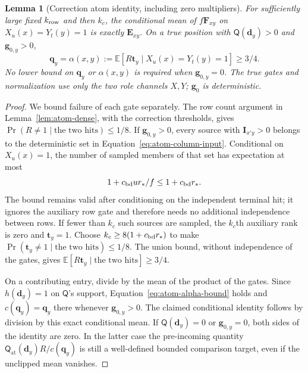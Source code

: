 \documentclass[11pt]{article}
\numberwithin{equation}{section}
\newtheorem{lemma}[theorem]{Lemma}
\theoremstyle{definition}
\theoremstyle{remark}
\begin{document}
\begin{lemma}[Correction atom identity, including zero multipliers]
\label{lem:atom-correction}
For sufficiently large fixed ${k_{\rm row}}$ and then ${k}_c$, the conditional mean of
$f{\mathbf{F}}_{xy}$ on $X_u(x)=Y_t(y)=1$ is exactly ${\mathbf{E}}_{xy}$.
On a true position with ${\mathsf{Q}}({\mathbf{d}}_y)>0$ and ${\mathbf{g}}_{0,y}>0$,
\begin{equation}
 {\mathbf{q}}_y=\alpha(x,y):=
  \mathbb E[R {\mathbf{t}}_y\mid X_u(x)=Y_t(y)=1]\ge3/4.
 \label{eq:atom-alpha-bound}
\end{equation}
No lower bound on ${\mathbf{q}}_y$ or $\alpha(x,y)$ is required when ${\mathbf{g}}_{0,y}=0$.
The true gates and normalization use only the two role channels $X,Y$;
${\mathbf{g}}_0$ is deterministic.
\end{lemma}

\begin{proof}
We bound failure of each gate separately. The row count argument in Lemma~\ref{lem:atom-dense}, with the correction
thresholds, gives $\Pr(R\ne1\mid\text{the two hits})\le1/8$.
If ${\mathbf{g}}_{0,y}>0$, every source with ${\mathbf{I}}_{x'y}>0$ belongs to the deterministic
set in Equation~\eqref{eq:atom-column-input}.  Conditional on $X_u(x)=1$,
the number of sampled members of that set has expectation at most
\[
 1+{c_{\rm bd}} u{r}_*/f\le1+{c_{\rm bd}} {r}_*.
\]
The bound remains valid after conditioning on the independent terminal
hit; it ignores the auxiliary row gate and therefore needs no additional
independence between rows.  If fewer than ${k}_c$ such sources are sampled,
the ${k}_c$th auxiliary rank is zero and ${\mathbf{t}}_y=1$.  Choose
${k}_c\ge8(1+{c_{\rm bd}} {r}_*)$ to make $\Pr({\mathbf{t}}_y\ne1\mid\text{the two hits})\le1/8$.
The union bound, without independence of the gates, gives
$\mathbb E[R{\mathbf{t}}_y\mid\text{the two hits}]\ge3/4$.

On a contributing entry, divide by the mean of the product of the gates. Since $h({\mathbf{d}}_y)=1$ on ${\mathsf{Q}}$'s support, Equation~\eqref{eq:atom-alpha-bound}
holds and $c({\mathbf{q}}_y)={\mathbf{q}}_y$ there whenever ${\mathbf{g}}_{0,y}>0$.  The claimed conditional
identity follows by division by this exact conditional mean.  If
${\mathsf{Q}}({\mathbf{d}}_y)=0$ or ${\mathbf{g}}_{0,y}=0$, both sides of the identity are zero.  In the latter
case the pre-incoming quantity ${\mathsf{Q}}_{\mathrm{at}}({\mathbf{d}}_y)R/c({\mathbf{q}}_y)$ is still a well-defined
bounded comparison target, even if the unclipped mean vanishes.
\end{proof}
\end{document}
